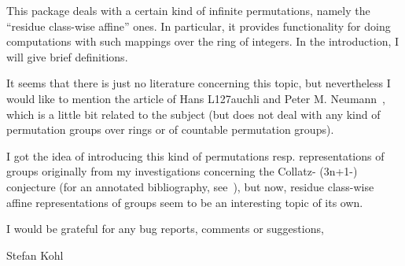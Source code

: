 

This package deals with a certain kind of infinite permutations,
namely the ``residue class-wise affine'' ones.
In particular, it provides functionality for doing computations with such
mappings over the ring of integers.
In the introduction, I will give brief definitions.

It seems that there is just no literature concerning this topic,
but nevertheless I would like to mention the article of Hans
L{\accent127a}uchli and  Peter M. Neumann~\cite{LaeuchliNeumann88}, which
is a little bit related to the subject (but does not deal with any kind
of permutation groups over rings or of countable permutation groups).

I got the idea of introducing this kind of permutations resp.
representations of groups originally from my investigations concerning
the Collatz- (3n+1-) conjecture (for an annotated bibliography,
see~\cite{Lagarias98}), but now, residue class-wise affine
representations of groups seem to be an interesting topic of its own.

I would be grateful for any bug reports, comments or suggestions,

\vfill

\hfill                 Stefan Kohl

